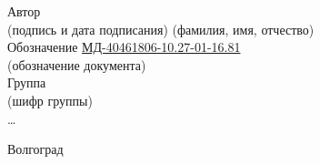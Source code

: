 \begin{titlepage}
\begin{center}
        \underline{\hspace{\textwidth}}
    \end{center}
    Автор \underline{\hspace{10em}}\quad\underline{\hspace{3em}\STUDENT\hspace{3em}}\\
    \vbox{\hspace{0.5em}\footnotesize(подпись и дата подписания)
        \hspace{10em}(фамилия, имя, отчество)\normalsize}\\
    Обозначение \underline{\hspace{6em}МД-40461806-10.27-01-16.81\hspace{9.5em}}\\
    \vbox{\hspace{0.4\textwidth}\footnotesize(обозначение документа)\normalsize}\\
    Группа \underline{\hspace{8em}}\\
    \vbox{\hspace{2em}\footnotesize(шифр группы)\normalsize}\\
    \ldots %
    \vspace{\fill}
    \begin{center}
        Волгоград \the\year
    \end{center}
\end{titlepage}